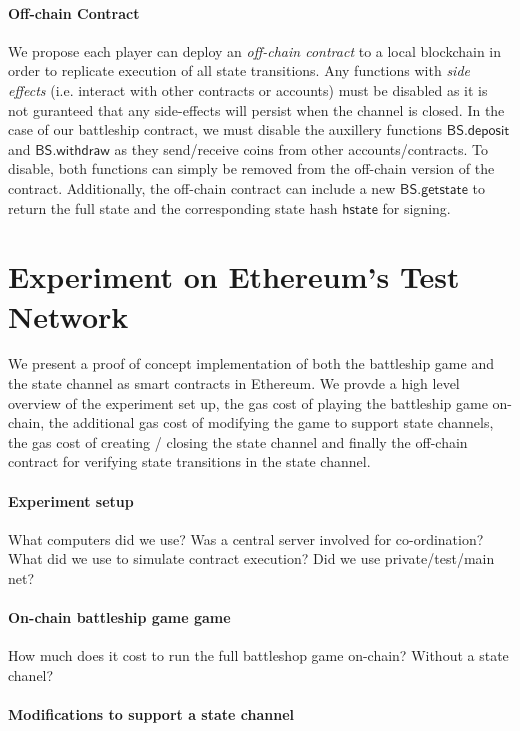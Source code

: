 \documentclass{llncs}
\newcommand{\hstate}{\mathsf{hstate}}
\newcommand{\battleshipdeposit}{\mathsf{BS.deposit}}
\newcommand{\battleshipwithdraw}{\mathsf{BS.withdraw}}
\newcommand{\battleshipgetstate}{\mathsf{BS.getstate}}
\begin{document}
\paragraph{Off-chain Contract} 
We propose each player can deploy an \textit{off-chain contract} to a local blockchain in order to replicate execution of all state transitions. 
Any functions with \textit{side effects} (i.e. interact with other contracts or accounts) must be disabled as it is not guranteed that any side-effects will persist when the channel is closed. 
In the case of our battleship contract, we must disable the auxillery functions $\battleshipdeposit$ and $\battleshipwithdraw$ as they send/receive coins from other accounts/contracts. 
To disable, both functions can simply be removed from the off-chain version of the contract. 
Additionally, the off-chain contract can include a new $\battleshipgetstate$ to return the full state and the corresponding state hash $\hstate$ for signing. 

\section{Experiment on Ethereum's Test Network}

We present a proof of concept implementation of both the battleship game and the state channel as smart contracts in Ethereum. 
We provde a high level overview of the experiment set up, the gas cost of playing the battleship game on-chain, the additional gas cost of modifying the game to support state channels, the gas cost of creating / closing the state channel and finally the off-chain contract for verifying state transitions in the state channel. 

\paragraph{Experiment setup} 

What computers did we use? Was a central server involved for co-ordination? What did we use to simulate contract execution? Did we use private/test/main net? 

\paragraph{On-chain battleship game game} 

How much does it cost to run the full battleshop game on-chain? Without a state chanel? 

\paragraph{Modifications to support a state channel} 
\end{document}
